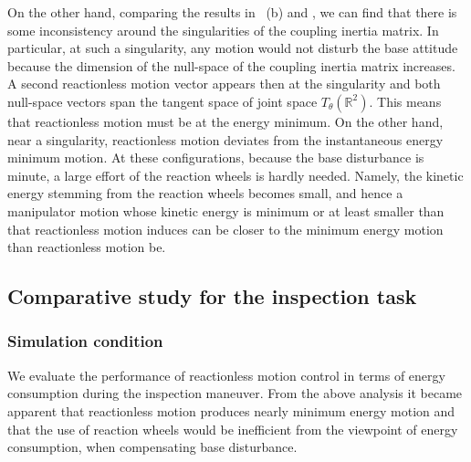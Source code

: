 On the other hand, comparing the results in ~(b) and ,
we can find that there is some  inconsistency around the singularities of the coupling 
inertia matrix. In particular, at such a singularity,
any motion would not disturb the base attitude because the dimension of the null-space of the 
coupling inertia matrix increases. A second reactionless motion vector appears then 
at the singularity and both null-space vectors span the  tangent space of joint 
space $T_{\theta}(\mathbb{R}^{2})$. This means that reactionless motion must be at 
the energy minimum. On the other hand,
near a singularity, reactionless motion deviates from the instantaneous energy 
minimum motion.
At these configurations, because the base disturbance is minute,
a large effort of the reaction wheels is hardly needed.
Namely, the kinetic energy stemming from the reaction wheels becomes small,
and hence a manipulator motion whose kinetic energy is minimum or at least smaller than
that reactionless motion induces can be closer to the minimum energy motion than reactionless motion be.


\subsection{Comparative  study for the inspection task}
\label{sec:comp}

\subsubsection{Simulation condition}
%
We evaluate the performance of reactionless motion control in terms of energy consumption
during the inspection maneuver.
From the above analysis it became apparent that reactionless motion produces nearly 
 minimum energy motion and that the use of reaction wheels would be inefficient from the 
viewpoint of energy consumption, when  compensating base disturbance.

